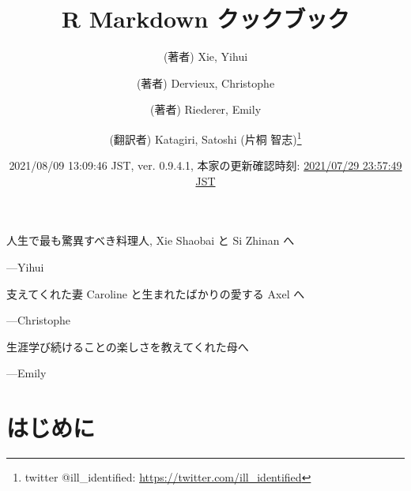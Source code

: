\documentclass[
  11pt,
  lualatex,ja=standard,jafont=noto]{bxjsreport}
\title{R Markdown クックブック}
\author{(著者) Xie, Yihui \and (著者) Dervieux, Christophe \and (著者) Riederer, Emily \and (翻訳者) Katagiri, Satoshi (片桐 智志)\footnote{twitter @ill\_identified: \url{https://twitter.com/ill_identified}}}
\date{2021/08/09 13:09:46 JST, ver. 0.9.4.1, 本家の更新確認時刻: \href{https://github.com/yihui/rmarkdown-cookbook}{2021/07/29 23:57:49 JST}}
\begin{document}
\maketitle

\cleardoublepage\newpage\thispagestyle{empty}\null
\cleardoublepage\newpage\thispagestyle{empty}\null
\thispagestyle{empty}
\begin{large}
人生で最も驚異すべき料理人, Xie Shaobai と Si Zhinan へ
\begin{flushright}
---Yihui
\end{flushright}

\bigskip

支えてくれた妻 Caroline と生まれたばかりの愛する Axel へ
\begin{flushright}
---Christophe
\end{flushright}

\bigskip

生涯学び続けることの楽しさを教えてくれた母へ
\begin{flushright}
---Emily
\end{flushright}
\end{large}

\setlength{\abovedisplayskip}{-5pt}
\setlength{\abovedisplayshortskip}{-5pt}

{
\hypersetup{linkcolor=}
\setcounter{tocdepth}{2}
\tableofcontents
}
\listoftables
\listoffigures
\hypertarget{ux306fux3058ux3081ux306b}{%
\chapter*{はじめに}\label{ux306fux3058ux3081ux306b}}
\end{document}
